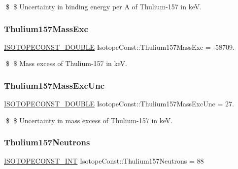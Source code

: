 \$ \$ Uncertainty in binding energy per A of Thulium-\/157 in keV. \mbox{\label{group___isotope_const-_thulium-_tm157_gac60b687154fbd0f56e9c3fe76c85d6c4}} 
\subsubsection{\texorpdfstring{Thulium157\+Mass\+Exc}{Thulium157MassExc}}
{\footnotesize\ttfamily \mbox{\hyperlink{group___isotope_const-_macros_ga8f45a7272ce02c0b4c65c44636ed719a}{I\+S\+O\+T\+O\+P\+E\+C\+O\+N\+S\+T\+\_\+\+D\+O\+U\+B\+LE}} Isotope\+Const\+::\+Thulium157\+Mass\+Exc = -\/58709.}

\$ \$ Mass excess of Thulium-\/157 in keV. \mbox{\label{group___isotope_const-_thulium-_tm157_gaae4160f50c4c9dc6e599a294d1397510}} 
\subsubsection{\texorpdfstring{Thulium157\+Mass\+Exc\+Unc}{Thulium157MassExcUnc}}
{\footnotesize\ttfamily \mbox{\hyperlink{group___isotope_const-_macros_ga8f45a7272ce02c0b4c65c44636ed719a}{I\+S\+O\+T\+O\+P\+E\+C\+O\+N\+S\+T\+\_\+\+D\+O\+U\+B\+LE}} Isotope\+Const\+::\+Thulium157\+Mass\+Exc\+Unc = 27.}

\$ \$ Uncertainty in mass excess of Thulium-\/157 in keV. \mbox{\label{group___isotope_const-_thulium-_tm157_ga1b7328431cacd23927c484afe566a022}} 
\subsubsection{\texorpdfstring{Thulium157\+Neutrons}{Thulium157Neutrons}}
{\footnotesize\ttfamily \mbox{\hyperlink{group___isotope_const-_macros_ga5f18360b3e99483a35c32d789e62621c}{I\+S\+O\+T\+O\+P\+E\+C\+O\+N\+S\+T\+\_\+\+I\+NT}} Isotope\+Const\+::\+Thulium157\+Neutrons = 88}

